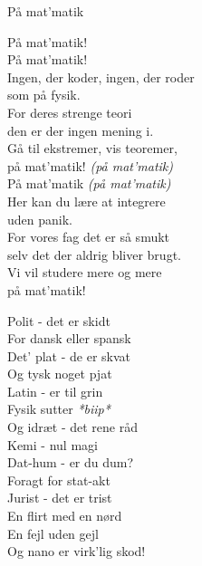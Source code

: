 \begin{song}{På mat'matik}
  \begin{SBChorus}
    På mat’matik!\\
    På mat’matik!\\
    Ingen, der koder, ingen, der roder\\
    som på fysik.\\\medskip
    For deres strenge teori\\
    den er der ingen mening i.\\
    Gå til ekstremer, vis teoremer,\\
    på mat’matik! \emph{(på mat’matik)}\\
    På mat’matik \emph{(på mat’matik)}\\\medskip
    Her kan du lære at integrere\\
    uden panik.\\
    For vores fag det er så smukt\\
    selv det der aldrig bliver brugt.\\
    Vi vil studere mere og mere\\
    på mat’matik!
  \end{SBChorus}

  \begin{SBSection*}
    Polit - det er skidt\\
    For dansk eller spansk\\
    Det’ plat - de er skvat\\
    Og tysk noget pjat\\\medskip
    Latin - er til grin\\
    Fysik sutter \emph{*biip*}\\
    Og idræt - det rene råd\\\medskip
    Kemi - nul magi\\
    Dat-hum - er du dum?\\
    Foragt for stat-akt\\
    Jurist - det er trist\\\medskip
    En flirt med en nørd\\
    En fejl uden gejl\\
    Og nano er virk’lig skod!
  \end{SBSection*}


\end{song}
